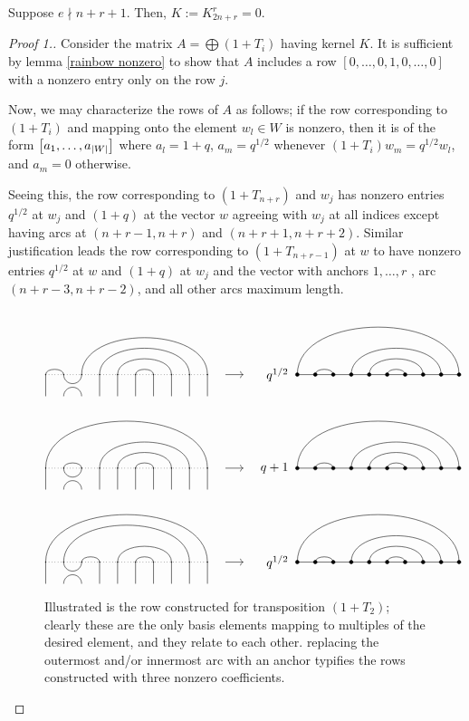 \documentclass{amsart}
\begin{document}
\begin{proposition}\label{Trivial}
  Suppose $e \nmid n + r + 1$.
  Then, $K := K_{2n + r}^r = 0$.
\end{proposition}
\begin{proof}[Proof 1.]
  Consider the matrix $A = \bigoplus (1 + T_i)$ having kernel $K$.
  It is sufficient by lemma \ref{rainbow nonzero} to show that $A$ includes a row $[0,\dots,0,1,0,\dots,0]$ with a nonzero entry only on the row $j$.

  Now, we may characterize the rows of $A$ as follows;
  if the row corresponding to $(1 + T_i)$ and mapping onto the element $w_l \in W$ is nonzero, then it is of the form $\left[ a_1,\dots,a_{\left| W \right|} \right]$ where $a_l = 1 + q$, $a_m = q^{1/2}$ whenever $(1 + T_i)w_m = q^{1/2}w_l$, and $a_m = 0$ otherwise.
  
  Seeing this, the row corresponding to $(1 + T_{n + r})$ and $w_j$ has nonzero entries $q^{1/2}$ at $w_j$ and $(1 + q)$ at the vector $w$ agreeing with $w_j$ at all indices except having arcs at $(n+r-1,n+r)$ and $(n+r+1,n+r+2)$.
  Similar justification leads the row corresponding to $(1 + T_{n+r-1})$ at $w$ to have nonzero entries $q^{1/2}$ at $w$ and $(1 + q)$ at $w_j$ and the vector with anchors $1,\dots,r$ , arc $(n+r-3,n+r-2)$, and all other arcs maximum length.
  
  \begin{figure}
   \[
     \Action{10}{1/2,3/10,4/9,5/8,6/7}{2}{1/10,2/3,4/9,5/8,6/7}{q^{1/2}}
   \]
   \[
     \Action{10}{1/10,2/3,4/9,5/8,6/7}{2}{1/10,2/3,4/9,5/8,6/7}{q+1}
   \]
   \[
     \Action{10}{1/10,2/9,3/4,5/8,6/7}{2}{1/10,2/3,4/9,5/8,6/7}{q^{1/2}}
   \]
   \caption{Illustrated is the row constructed for transposition $(1 + T_2)$; clearly these are the only basis elements mapping to multiples of the desired element, and they relate to each other.
     replacing the outermost and/or innermost arc with an anchor typifies the rows constructed with three nonzero coefficients.}
 \label{Submatrix}
\end{figure}
 

\end{proof}
\end{document}
